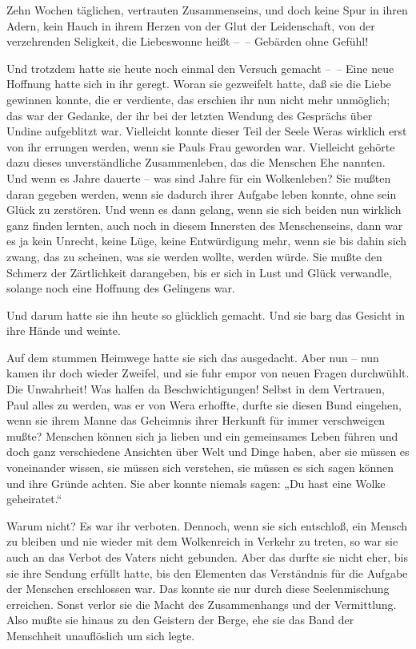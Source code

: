 Zehn Wochen täglichen, vertrauten Zusammenseins, und doch keine
Spur in ihren Adern, kein Hauch in ihrem Herzen von der Glut der
Leidenschaft, von der verzehrenden Seligkeit, die Liebeswonne heißt
–~– Gebärden ohne Gefühl!

Und trotzdem hatte sie heute noch einmal den Versuch gemacht –~–
Eine neue Hoffnung hatte sich in ihr geregt. Woran sie gezweifelt
hatte, daß sie die Liebe gewinnen konnte, die er verdiente, das
erschien ihr nun nicht mehr unmöglich; das war der Gedanke, der ihr
bei der letzten Wendung des Gesprächs über Undine aufgeblitzt war.
Vielleicht konnte dieser Teil der Seele Weras wirklich erst von ihr
errungen werden, wenn sie Pauls Frau geworden war. Vielleicht
gehörte dazu dieses unverständliche Zusammenleben, das die Menschen
Ehe nannten. Und wenn es Jahre dauerte – was sind Jahre für ein
Wolkenleben? Sie mußten daran gegeben werden, wenn sie dadurch
ihrer Aufgabe leben konnte, ohne sein Glück zu zerstören. Und wenn
es dann gelang, wenn sie sich beiden nun wirklich ganz finden
lernten, auch noch in diesem Innersten des Menschenseins, dann war
es ja kein Unrecht, keine Lüge, keine Entwürdigung mehr, wenn sie
bis dahin sich zwang, das zu scheinen, was sie werden wollte,
werden würde. Sie mußte den Schmerz der Zärtlichkeit darangeben,
bis er sich in Lust und Glück verwandle, solange noch eine Hoffnung
des Gelingens war.

Und darum hatte sie ihn heute so glücklich gemacht. Und sie barg
das Gesicht in ihre Hände und weinte.

Auf dem stummen Heimwege hatte sie sich das ausgedacht. Aber nun –
nun kamen ihr doch wieder Zweifel, und sie fuhr empor von neuen
Fragen durchwühlt. Die Unwahrheit! Was halfen da Beschwichtigungen!
Selbst in dem Vertrauen, Paul alles zu werden, was er von Wera
erhoffte, durfte sie diesen Bund eingehen, wenn sie ihrem Manne das
Geheimnis ihrer Herkunft für immer verschweigen mußte? Menschen
können sich ja lieben und ein gemeinsames Leben führen und doch
ganz verschiedene Ansichten über Welt und Dinge haben, aber sie
müssen es voneinander wissen, sie müssen sich verstehen, sie müssen
es sich sagen können und ihre Gründe achten. Sie aber konnte
niemals sagen: „Du hast eine Wolke geheiratet.“

Warum nicht? Es war ihr verboten. Dennoch, wenn sie sich entschloß,
ein Mensch zu bleiben und nie wieder mit dem Wolkenreich in Verkehr
zu treten, so war sie auch an das Verbot des Vaters nicht gebunden.
Aber das durfte sie nicht eher, bis sie ihre Sendung erfüllt hatte,
bis den Elementen das Verständnis für die Aufgabe der Menschen
erschlossen war. Das konnte sie nur durch diese Seelenmischung
erreichen. Sonst verlor sie die Macht des Zusammenhangs und der
Vermittlung. Also mußte sie hinaus zu den Geistern der Berge, ehe
sie das Band der Menschheit unauflöslich um sich legte.

